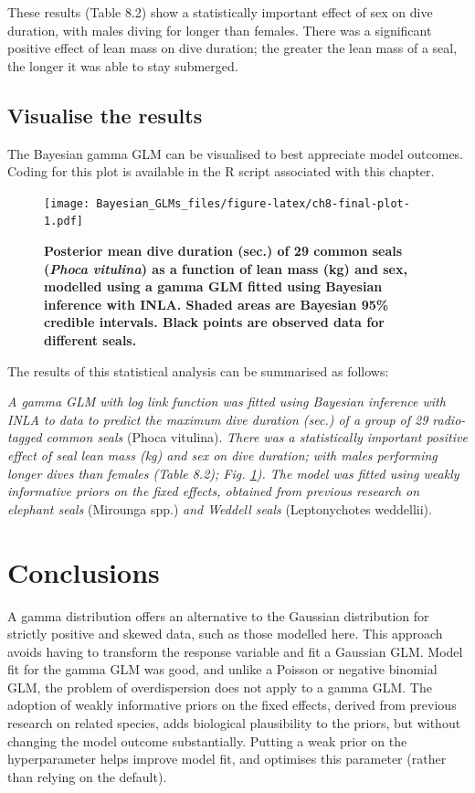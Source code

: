 \documentclass[
]{book}
\begin{document}
These results (Table 8.2) show a statistically important effect of sex on dive duration, with males diving for longer than females. There was a significant positive effect of lean mass on dive duration; the greater the lean mass of a seal, the longer it was able to stay submerged.

\hypertarget{visualise-the-results-4}{%
\subsection{Visualise the results}\label{visualise-the-results-4}}

The Bayesian gamma GLM can be visualised to best appreciate model outcomes. Coding for this plot is available in the R script associated with this chapter.



\begin{figure}
\centering
\texttt{[image: Bayesian\_GLMs\_files/figure-latex/ch8-final-plot-1.pdf]}
\caption{\label{fig:ch8-final-plot}\textbf{Posterior mean dive duration (sec.) of 29 common seals (\emph{Phoca vitulina}) as a function of lean mass (kg) and sex, modelled using a gamma GLM fitted using Bayesian inference with INLA. Shaded areas are Bayesian 95\% credible intervals. Black points are observed data for different seals.}}
\end{figure}

The results of this statistical analysis can be summarised as follows:

\emph{A gamma GLM with log link function was fitted using Bayesian inference with INLA to data to predict the maximum dive duration (sec.) of a group of 29 radio-tagged common seals} (Phoca vitulina). \emph{There was a statistically important positive effect of seal lean mass (kg) and sex on dive duration; with males performing longer dives than females (Table 8.2); Fig. \ref{fig:ch8-final-plot}). The model was fitted using weakly informative priors on the fixed effects, obtained from previous research on elephant seals} (Mirounga spp.) \emph{and Weddell seals} (Leptonychotes weddellii).

\hypertarget{conclusions-5}{%
\section{Conclusions}\label{conclusions-5}}

A gamma distribution offers an alternative to the Gaussian distribution for strictly positive and skewed data, such as those modelled here. This approach avoids having to transform the response variable and fit a Gaussian GLM. Model fit for the gamma GLM was good, and unlike a Poisson or negative binomial GLM, the problem of overdispersion does not apply to a gamma GLM. The adoption of weakly informative priors on the fixed effects, derived from previous research on related species, adds biological plausibility to the priors, but without changing the model outcome substantially. Putting a weak prior on the hyperparameter helps improve model fit, and optimises this parameter (rather than relying on the default).
\end{document}
